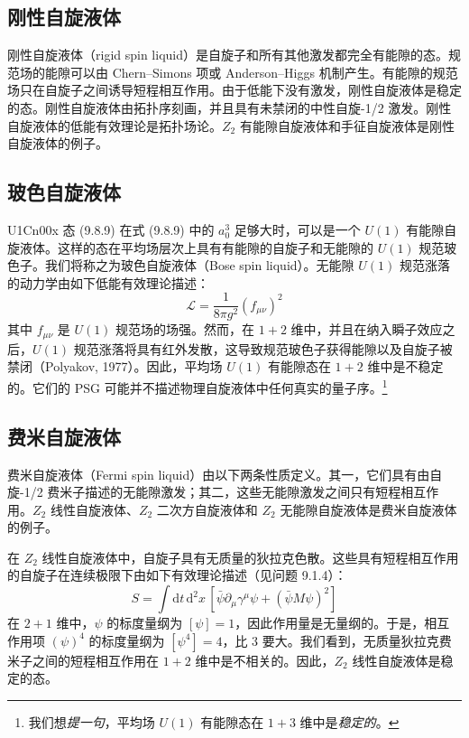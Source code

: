 \subsection{刚性自旋液体}

刚性自旋液体（rigid spin liquid）是自旋子和所有其他激发都完全有能隙的态。规范场的能隙可以由 Chern--Simons 项或 Anderson--Higgs 机制产生。有能隙的规范场只在自旋子之间诱导短程相互作用。由于低能下没有激发，刚性自旋液体是稳定的态。刚性自旋液体由拓扑序刻画，并且具有未禁闭的中性自旋-1/2 激发。刚性自旋液体的低能有效理论是拓扑场论。$Z_2$ 有能隙自旋液体和手征自旋液体是刚性自旋液体的例子。

\subsection{玻色自旋液体}

U1Cn00x 态 (9.8.9) 在式 (9.8.9) 中的 $a_{0}^{3}$ 足够大时，可以是一个 $U(1)$ 有能隙自旋液体。这样的态在平均场层次上具有有能隙的自旋子和无能隙的 $U(1)$ 规范玻色子。我们将称之为玻色自旋液体（Bose spin liquid）。无能隙 $U(1)$ 规范涨落的动力学由如下低能有效理论描述：
\begin{equation*}
\mathcal{L}=\frac{1}{8\pi g^{2}}\left(f_{\mu\nu}\right)^{2}
\end{equation*}
其中 $f_{\mu\nu}$ 是 $U(1)$ 规范场的场强。然而，在 $1+2$ 维中，并且在纳入瞬子效应之后，$U(1)$ 规范涨落将具有红外发散，这导致规范玻色子获得能隙以及自旋子被禁闭（Polyakov, 1977）。因此，平均场 $U(1)$ 有能隙态在 $1+2$ 维中是不稳定的。它们的 PSG 可能并不描述物理自旋液体中任何真实的量子序。\footnote{我们想\emph{提一句}，平均场 $U(1)$ 有能隙态在 $1+3$ 维中是\emph{稳定的}。}

\subsection{费米自旋液体}

费米自旋液体（Fermi spin liquid）由以下两条性质定义。其一，它们具有由自旋-1/2 费米子描述的无能隙激发；其二，这些无能隙激发之间只有短程相互作用。$Z_2$ 线性自旋液体、$Z_2$ 二次方自旋液体和 $Z_2$ 无能隙自旋液体是费米自旋液体的例子。

在 $Z_2$ 线性自旋液体中，自旋子具有无质量的狄拉克色散。这些具有短程相互作用的自旋子在连续极限下由如下有效理论描述（见问题 9.1.4）：
\begin{equation*}
S=\int\mathrm{d}t\,\mathrm{d}^{2}x\,\left[\bar{\psi}\partial_{\mu}\gamma^{\mu}\psi+\left(\bar{\psi}M\psi\right)^{2}\right]
\end{equation*}
在 $2+1$ 维中，$\psi$ 的标度量纲为 $[\psi]=1$，因此作用量是无量纲的。于是，相互作用项 $(\psi)^{4}$ 的标度量纲为 $[\psi^{4}]=4$，比 3 要大。我们看到，无质量狄拉克费米子之间的短程相互作用在 $1+2$ 维中是不相关的。因此，$Z_2$ 线性自旋液体是稳定的态。

